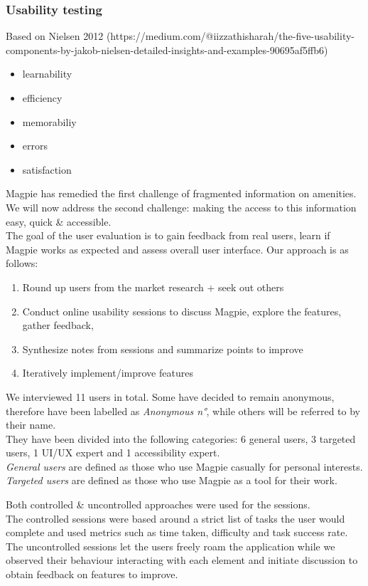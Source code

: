 
\subsubsection{Usability testing}
Based on Nielsen 2012 (https://medium.com/@iizzathisharah/the-five-usability-components-by-jakob-nielsen-detailed-insights-and-examples-90695af5ffb6)

\begin{itemize}
    \item learnability
    \item efficiency
    \item memorabiliy
    \item errors
    \item satisfaction
\end{itemize}
Magpie has remedied the first challenge of fragmented information on amenities. We will now address the second challenge: making the access to this information easy, quick \& accessible.\\

\noindent The goal of the user evaluation is to gain feedback from real users, learn if Magpie works as expected and assess overall user interface. Our approach is as follows:
\begin{enumerate}
    \item Round up users from the market research + seek out others
    \item Conduct online usability sessions to discuss Magpie, explore the features, gather feedback,
    \item Synthesize notes from sessions and summarize points to improve
    \item Iteratively implement/improve features
\end{enumerate}
We interviewed 11 users in total. Some have decided to remain anonymous, therefore have been labelled as \emph{Anonymous n°}, while others will be referred to by their name. \\ They have been divided into the following categories: 6 general users, 3 targeted users, 1 UI/UX expert and 1 accessibility expert.\\
\emph{General users} are defined as those who use Magpie casually for personal interests.\\ \emph{Targeted users} are defined as those who use Magpie as a tool for their work.

\noindent Both controlled \& uncontrolled approaches were used for the sessions.\\
The controlled sessions were based around a strict list of tasks the user would complete and used metrics such as time taken, difficulty and task success rate.\\
The uncontrolled sessions let the users freely roam the application while we observed their behaviour interacting with each element and initiate discussion to obtain feedback on features to improve.\\

